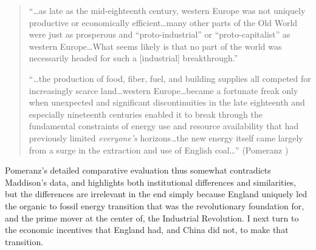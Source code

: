\documentclass[12pt]{article}
\numberwithin{equation}{section}
\begin{document}
		\begin{quotation}
		``\ldots as late as the mid-eighteenth century, western Europe was not uniquely productive or economically efficient\ldots many other parts of the Old World were just as prosperous and ``proto-industrial'' or ``proto-capitalist'' as western Europe\ldots What seems likely is that no part of the world was necessarily headed for such a [industrial] breakthrough.''
		
		``\ldots the production of food, fiber, fuel, and building supplies all competed for increasingly scarce land\ldots western Europe\ldots became a fortunate freak only when unexpected and significant discontinuities in the late eighteenth and especially nineteenth centuries enabled it to break through the fundamental constraints of energy use and resource availability that had previously limited \textit{everyone's} horizons\dots the new energy itself came largely from a surge in the extraction and use of English coal\ldots'' (Pomeranz \citeyear[pp.~206--07]{pomeranz_great_2001})
		\end{quotation} 
		
		Pomeranz's detailed comparative evaluation thus somewhat contradicts Maddison's data, and highlights both institutional differences and similarities, but the differences are irrelevant in the end simply because England uniquely led the organic to fossil energy transition that was the revolutionary foundation for, and the prime mover at the center of, the Industrial Revolution. I next turn to the economic incentives that England had, and China did not, to make that transition.
		
		

			
\end{document}
